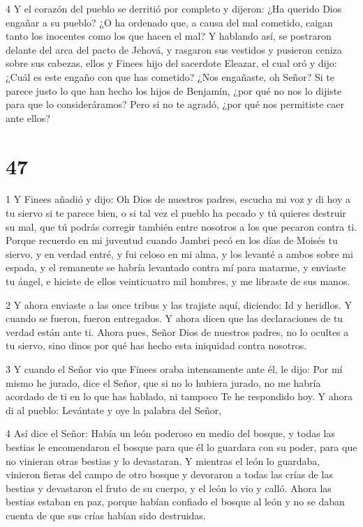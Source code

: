 \par 4 Y el corazón del pueblo se derritió por completo y dijeron: ¿Ha querido Dios engañar a su pueblo? ¿O ha ordenado que, a causa del mal cometido, caigan tanto los inocentes como los que hacen el mal? Y hablando así, se postraron delante del arca del pacto de Jehová, y rasgaron sus vestidos y pusieron ceniza sobre sus cabezas, ellos y Finees hijo del sacerdote Eleazar, el cual oró y dijo: ¿Cuál es este engaño con que has cometido? ¿Nos engañaste, oh Señor? Si te parece justo lo que han hecho los hijos de Benjamín, ¿por qué no nos lo dijiste para que lo consideráramos? Pero si no te agradó, ¿por qué nos permitiste caer ante ellos?



\chapter{47}

\par 1 Y Finees añadió y dijo: Oh Dios de nuestros padres, escucha mi voz y di hoy a tu siervo si te parece bien, o si tal vez el pueblo ha pecado y tú quieres destruir su mal, que tú podrás corregir también entre nosotros a los que pecaron contra ti. Porque recuerdo en mi juventud cuando Jambri pecó en los días de Moisés tu siervo, y en verdad entré, y fui celoso en mi alma, y ​​los levanté a ambos sobre mi espada, y el remanente se habría levantado contra mí para matarme, y enviaste tu ángel, e hiciste de ellos veinticuatro mil hombres, y me libraste de sus manos.

\par 2 Y ahora enviaste a las once tribus y las trajiste aquí, diciendo: Id y heridlos. Y cuando se fueron, fueron entregados. Y ahora dicen que las declaraciones de tu verdad están ante ti. Ahora pues, Señor Dios de nuestros padres, no lo ocultes a tu siervo, sino dinos por qué has hecho esta iniquidad contra nosotros.

\par 3 Y cuando el Señor vio que Finees oraba intensamente ante él, le dijo: Por mí mismo he jurado, dice el Señor, que si no lo hubiera jurado, no me habría acordado de ti en lo que has hablado, ni tampoco Te he respondido hoy. Y ahora di al pueblo: Levántate y oye la palabra del Señor,

\par 4 Así dice el Señor: Había un león poderoso en medio del bosque, y todas las bestias le encomendaron el bosque para que él lo guardara con su poder, para que no vinieran otras bestias y lo devastaran. Y mientras el león lo guardaba, vinieron fieras del campo de otro bosque y devoraron a todas las crías de las bestias y devastaron el fruto de su cuerpo, y el león lo vio y calló. Ahora las bestias estaban en paz, porque habían confiado el bosque al león y no se daban cuenta de que sus crías habían sido destruidas.

